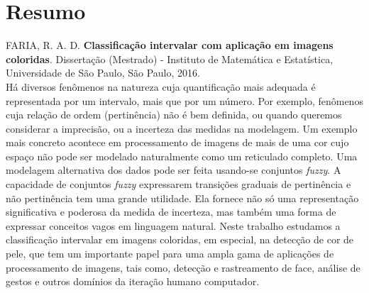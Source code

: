 \documentclass[11pt,twoside,a4paper]{book}
\theoremstyle{plain}
\theoremstyle{definition}
\begin{document}





\chapter*{Resumo}

\noindent FARIA, R. A. D. \textbf{Classificação intervalar com aplicação em imagens coloridas}.
Dissertação (Mestrado) - Instituto de Matemática e Estatística,
Universidade de São Paulo, São Paulo, 2016.
\\

Há diversos fenômenos na natureza cuja quantificação mais adequada é representada por um intervalo, mais que por um número. Por exemplo, fenômenos cuja relação de ordem (pertinência) não é bem definida, ou quando queremos considerar a imprecisão, ou a incerteza das medidas na modelagem. 
%
Um exemplo mais concreto acontece em processamento de imagens de mais de uma cor cujo espaço não pode ser modelado naturalmente como um reticulado completo. 
%
Uma modelagem alternativa dos dados pode ser feita usando-se conjuntos \emph{fuzzy}. 
%
A capacidade de conjuntos \emph{fuzzy} expressarem transições graduais de pertinência e não pertinência tem uma grande utilidade. Ela fornece não só uma representação significativa e poderosa da medida de incerteza, mas também uma forma de expressar conceitos vagos em linguagem natural. 
%
Neste trabalho estudamos a classificação intervalar em imagens coloridas, em especial, na detecção de cor de pele, que tem um importante papel para uma ampla gama de aplicações de processamento de imagens, tais como, detecção e rastreamento de face, análise de gestos e outros domínios da iteração humano computador. 
\\
\end{document}
